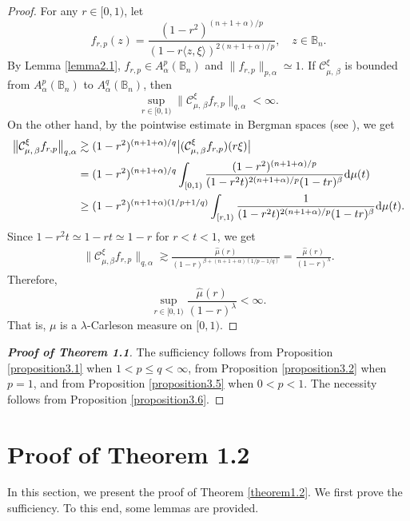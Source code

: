 \documentclass[preprint,12pt,times]{elsarticle}
\theoremstyle{definition}
\theoremstyle{remark}
\numberwithin{equation}{section}
\begin{document}
\begin{proof}
For any $r\in [0,1)$, let 
\[
    f_{r,p}(z)=\frac{(1-r^2)^{(n+1+\alpha)/p}}{(1-r\langle z,\xi\rangle)^{2(n+1+\alpha)/p}}, \quad z\in\mathbb B_n.
\]
By Lemma \ref{lemma2.1}, $f_{r,p}\in A_{\alpha}^p(\mathbb{B}_n)$ and $\|f_{r,p}\|_{p,\alpha}\simeq 1$. If $\mathcal{C}_{\mu,\,\beta}^{\xi}$ is bounded from $A_{\alpha}^p(\mathbb{B}_n)$ to $A_{\alpha}^q(\mathbb{B}_n)$, then 
\[
    \sup_{r\in [0,1)}\big\|\mathcal{C}_{\mu,\,\beta}^{\xi}f_{r,p}\big\|_{q,\alpha}<\infty.
\]
On the other hand, by the pointwise estimate in Bergman spaces (see \cite[Theorem 2.1]{Zhu2005}), we get
\begin{align*}
\big\|\mathcal{C}_{\mu,\,\beta}^{\xi}f_{r,p}\big\|_{q,\alpha}&\gtrsim (1-r^2)^{(n+1+\alpha)/q}\big|(\mathcal{C}_{\mu,\,\beta}^{\xi}f_{r,p})(r\xi)\big|\\
&=(1-r^2)^{(n+1+\alpha)/q}\int_{[0,1)}\frac{(1-r^2)^{(n+1+\alpha)/p}}{(1-r^2t)^{2(n+1+\alpha)/p}(1-tr)^{\beta}}{\rm d}\mu(t)\\
&\geq (1-r^2)^{(n+1+\alpha)(1/p+1/q)}\int_{[r,1)}\frac{1}{(1-r^2t)^{2(n+1+\alpha)/p}(1-tr)^{\beta}}{\rm d}\mu(t).
\end{align*}
Since $1-r^2t\simeq 1-rt\simeq 1-r$ for $r<t<1$, we get
\begin{align*}
\big\|\mathcal{C}_{\mu,\beta}^{\xi}f_{r,p}\big\|_{q,\alpha}\gtrsim \frac{\hat{\mu}(r)}{(1-r)^{\beta+(n+1+\alpha)(1/p-1/q)}}=\frac{\hat{\mu}(r)}{(1-r)^{\lambda}}.
\end{align*}
Therefore,
\[
    \sup_{r\in [0,1)}\frac{\hat{\mu}(r)}{(1-r)^{\lambda}}<\infty.
\]
That is, $\mu$ is a $\lambda$-Carleson measure on $[0,1)$.
\end{proof}

\begin{proof}[{\bf Proof of Theorem 1.1}] 
The sufficiency follows from Proposition \ref{proposition3.1} when
$1<p\leq q<\infty$, from Proposition \ref{proposition3.2} when   $p=1$,
and from Proposition \ref{proposition3.5} when $0<p<1$. The necessity
follows from Proposition \ref{proposition3.6}. 
\end{proof}

\section{Proof of Theorem 1.2}

In this section, we present the proof of Theorem \ref{theorem1.2}. We first prove the sufficiency. To this end, some lemmas are provided.
\end{document}
